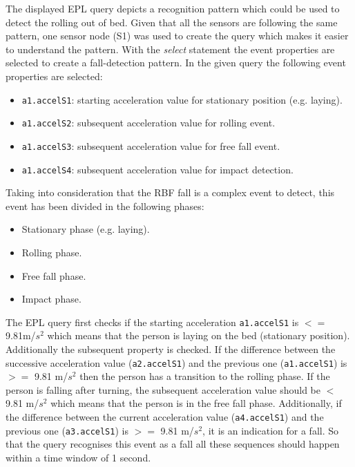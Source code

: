 \documentclass[review]{elsarticle}
\begin{document}
The displayed EPL query depicts a recognition pattern which could be used to detect the rolling out of bed. Given that all the sensors are following the same pattern, one sensor node (S1) was used to create the query which makes it easier to understand the pattern. With the \textit{select} statement the event properties are selected to create a fall-detection pattern. In the given query the following event properties are selected:
\begin{itemize}
  \item \texttt{a1.accelS1}: starting acceleration value for stationary position (e.g. laying).
  \item \texttt{a1.accelS2}: subsequent acceleration value for rolling event.
  \item \texttt{a1.accelS3}: subsequent acceleration value for free fall event.
  \item \texttt{a1.accelS4}: subsequent acceleration value for impact detection.
\end{itemize}

Taking into consideration that the RBF fall is a complex event to detect, this event has been divided in the following phases:

\begin{itemize}
  \item Stationary phase (e.g. laying).
  \item Rolling phase.
  \item Free fall phase.
  \item Impact phase.
\end{itemize}

The EPL query first checks if the starting acceleration \texttt{a1.accelS1} is $<=$ 9.81m/$s^2$ which means that the person is laying 
on the bed (stationary position). Additionally the subsequent property is checked. If the difference between the successive 
acceleration value (\texttt{a2.accelS1}) and the previous one (\texttt{a1.accelS1}) is $>=$ 9.81 m/$s^2$ then the person has a transition to 
the rolling phase. If the person is falling after turning, the subsequent acceleration value should be $<$ 9.81 m/$s^2$ 
which means that the person is in the free fall phase. Additionally, if the difference between the current acceleration value 
(\texttt{a4.accelS1}) and the previous one (\texttt{a3.accelS1}) is $>=$ 9.81 m/$s^2$, it is an indication for a fall. So that the query 
recognises this event as a fall all these sequences should happen within a time window of 1 second.
\end{document}
